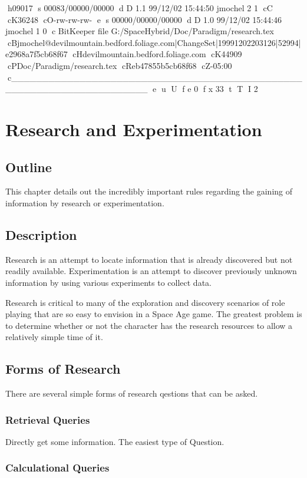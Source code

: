 h09017
s 00083/00000/00000
d D 1.1 99/12/02 15:44:50 jmochel 2 1
cC
cK36248
cO-rw-rw-rw-
e
s 00000/00000/00000
d D 1.0 99/12/02 15:44:46 jmochel 1 0
c BitKeeper file G:/SpaceHybrid/Doc/Paradigm/research.tex
cBjmochel@devilmountain.bedford.foliage.com|ChangeSet|19991202203126|52994|e2968a7f5cb68f67
cHdevilmountain.bedford.foliage.com
cK44909
cPDoc/Paradigm/research.tex
cReb47855b5cb68f68
cZ-05:00
c______________________________________________________________________
e
u
U
f e 0
f x 33
t
T
I 2
\chapter{Research and Experimentation}

\section{Outline}

This chapter details out the incredibly important rules regarding the 
gaining of information by research or experimentation.
\section{Description}

Research is an attempt to locate information that is 
already discovered but not readily available. Experimentation is an 
attempt to discover previously unknown information by using various 
experiments to collect data.

Research is critical to many of the exploration and discovery 
scenarios of role playing that are so easy to envision in a Space Age 
game. The greatest problem is to determine whether or not the 
character has the research resources to allow a relatively simple 
time of it.

\section{Forms of Research}

There are several simple forms of research qestions that can be 
asked.

\subsection{Retrieval Queries}

Directly get some information. The easiest type of Question. 

\subsection{Calculational Queries}

